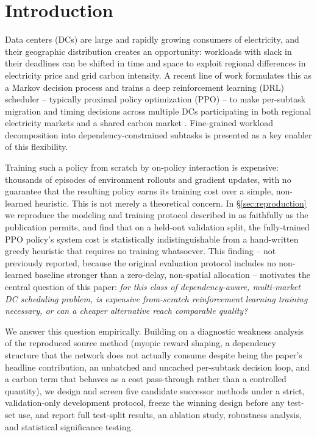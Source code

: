 \documentclass[journal]{IEEEtran}
\begin{document}
\section{Introduction}

Data centers (DCs) are large and rapidly growing consumers of electricity, and their geographic distribution creates an opportunity: workloads with slack in their deadlines can be shifted in time and space to exploit regional differences in electricity price and grid carbon intensity. A recent line of work formulates this as a Markov decision process and trains a deep reinforcement learning (DRL) scheduler -- typically proximal policy optimization (PPO) -- to make per-subtask migration and timing decisions across multiple DCs participating in both regional electricity markets and a shared carbon market \cite{sourcepaper}. Fine-grained workload decomposition into dependency-constrained subtasks is presented as a key enabler of this flexibility.

Training such a policy from scratch by on-policy interaction is expensive: thousands of episodes of environment rollouts and gradient updates, with no guarantee that the resulting policy earns its training cost over a simple, non-learned heuristic. This is not merely a theoretical concern. In \S\ref{sec:reproduction} we reproduce the modeling and training protocol described in \cite{sourcepaper} as faithfully as the publication permits, and find that on a held-out validation split, the fully-trained PPO policy's system cost is statistically indistinguishable from a hand-written greedy heuristic that requires no training whatsoever. This finding -- not previously reported, because the original evaluation protocol includes no non-learned baseline stronger than a zero-delay, non-spatial allocation -- motivates the central question of this paper: \textit{for this class of dependency-aware, multi-market DC scheduling problem, is expensive from-scratch reinforcement learning training necessary, or can a cheaper alternative reach comparable quality?}

We answer this question empirically. Building on a diagnostic weakness analysis of the reproduced source method (myopic reward shaping, a dependency structure that the network does not actually consume despite being the paper's headline contribution, an unbatched and uncached per-subtask decision loop, and a carbon term that behaves as a cost pass-through rather than a controlled quantity), we design and screen five candidate successor methods under a strict, validation-only development protocol, freeze the winning design before any test-set use, and report full test-split results, an ablation study, robustness analysis, and statistical significance testing.
\end{document}
